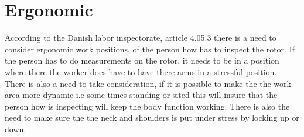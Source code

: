 \section{Ergonomic}
According to the Danish labor inspectorate, article 4.05.3 there is a need to consider ergonomic work positions, of the person how has to inspect the rotor.
If the person has to do measurements on the rotor, it needs to be in a position where there the worker does have to have there arms in a stressful position.
There is also a need to take consideration, if it is possible to make the the work area more dynamic i.e some times standing or sited this will insure that the person how is inspecting will keep the body function working.
There is also the need to make sure the the neck and shoulders is put under stress by locking up or down\cite{ATpostions}.